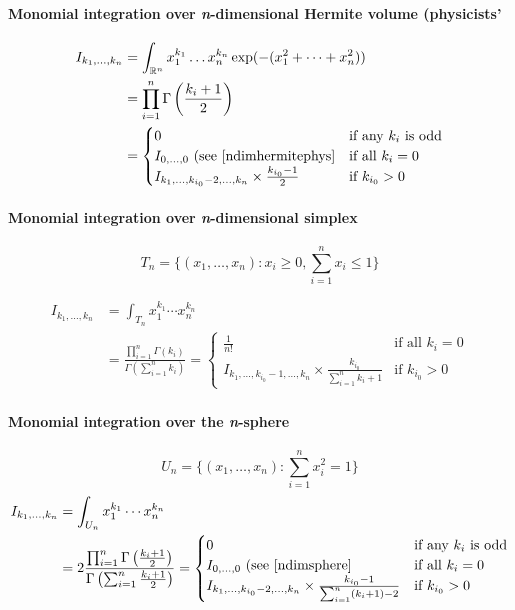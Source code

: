 \documentclass{scrartcl}
\begin{document}
\paragraph{Monomial integration over \textit{n}-dimensional Hermite volume (physicists'}
\[
  \begin{split}
  I_{k_1,\dots,k_n}
  &= \int_{\mathbb{R}^n} x_1^{k_1}\dots x_n^{k_n} \exp(-(x_1^2+\dots+x_n^2))\\
  &= \prod_{i=1}^n \Gamma\left(\frac{k_i+1}{2}\right)\\
  &=\begin{cases}
    0&\text{if any $k_i$ is odd}\\
    I_{0,\dots,0} \text{ (see \eqref{ndimhermitephys}}&\text{if all $k_i=0$}\\
    I_{k_1,\dots,k_{i_0}-2,\dots,k_n} \times \frac{k_{i_0} - 1}{2}&\text{if $k_{i_0} > 0$}
  \end{cases}
  \end{split}
\]

\paragraph{Monomial integration over \textit{n}-dimensional simplex}
\[
  T_n = \{(x_1,\dots,x_n):x_i \geq 0, \sum_{i=1}^n x_i \leq 1\}
\]

\[
  \begin{split}
  I_{k_1,\dots,k_n}
  &= \int_{T_n} x_1^{k_1}\cdots x_n^{k_n}\\
  &= \frac{\prod_{i=1}^n\Gamma(k_i)}{\Gamma\left(\sum_{i=1}^n k_i\right)}
  =\begin{cases}
    \frac{1}{n!}&\text{if all $k_i=0$}\\
    I_{k_1,\dots,k_{i_0}-1,\dots,k_n} \times \frac{k_{i_0}}{\sum_{i=1}^n k_i+1}&\text{if $k_{i_0} > 0$}
  \end{cases}
\end{split}
\]

\paragraph{Monomial integration over the \textit{n}-sphere}
\cite{folland}
\[
  U_n = \{(x_1,\dots,x_n): \sum_{i=1}^n x_i^2 = 1\}
\]
\[
  \begin{split}
  I_{k_1,\dots,k_n}
  &= \int_{U_n} x_1^{k_1}\cdots x_n^{k_n}\\
  &= 2 \frac{\prod_{i=1}^n
    \Gamma\left(\frac{k_i+1}{2}\right)}{\Gamma\left(\sum_{i=1}^n\frac{k_i+1}{2}\right)}
  =\begin{cases}
    0&\text{if any $k_i$ is odd}\\
    I_{0,\dots,0} \text{ (see \eqref{ndimsphere}}&\text{if all $k_i=0$}\\
    I_{k_1,\dots,k_{i_0}-2,\dots,k_n} \times \frac{k_{i_0} - 1}{\sum_{i=1}^n (k_i+1) - 2}&\text{if $k_{i_0} > 0$}
  \end{cases}
  \end{split}
\]
\end{document}
